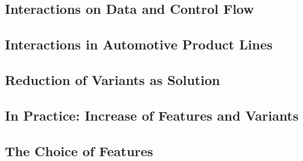 \subsection{Interactions on Data and Control Flow}
\subsection{Interactions in Automotive Product Lines}
\subsection{Reduction of Variants as Solution}
\subsection{In Practice: Increase of Features and Variants}
\subsection{The Choice of Features}

%

\lessonslearned{
	\item \ldots
}{
	\item \ldots
}{
	\ldots
}




